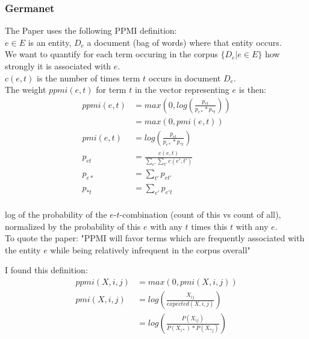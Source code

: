 \documentclass[11pt,
  paper=a4, 
  hidelinks,
  bibliography=totocnumbered,
	captions=tableheading,
	BCOR=10mm
]{scrreprt}
\theoremstyle{definition}
\begin{document}
\subsubsection*{Germanet}

\cite{hamp-feldweg-1997-germanet}
\cite{Henrich}

The Paper uses the following PPMI definition:\\ 

\noindent $e \in E$ is an entity, $D_e$ a document (bag of words) where that entity occurs.\\
We want to quantify for each term occuring in the corpus $\{D_e | e \in E\}$ how strongly it is associated with $e$.\\
$c(e,t)$ is the number of times term $t$ occurs in document $D_e$. \\
The weight $ppmi(e,t)$ for term $t$ in the vector representing $e$ is then:
\begin{align*}
ppmi(e,t) &= max\left(0, log\left( \frac{p_{et}}{p_{e*}*p_{*t}} \right) \right) \\
          &= max\left(0, pmi(e,t) \right) \\
 pmi(e,t) &= log\left( \frac{p_{et}}{p_{e*}*p_{*t}} \right) \\          
   p_{et} &= \frac{c(e,t)}{\sum_{e'}\sum_{t'} c(e',t')} \\
   p_{e*} &= \sum_{t'}p_{et'} \\
   p_{*t} &= \sum_{e'}p_{e't} \\
\end{align*}

\noindent log of the probability of the $e$-$t$-combination (count of this vs count of all), normalized by the probability of this $e$ with any $t$ times this $t$ with any $e$.\\
To quote the paper: "PPMI will favor terms which are frequently associated with the entity $e$ while being relatively infrequent in the corpus overall"

\vspace{30px}

I found this definition:
\begin{align*}
ppmi(X,i,j) &= max(0, pmi(X,i,j)) \\
pmi(X,i,j)  &= log\left( \frac{X_{ij}}{expected(X,i,j)} \right) \\
            &= log\left( \frac{P(X_{ij})}{P(X_{i*}) * P(X_{*j})} \right)
\end{align*}


\end{document}
